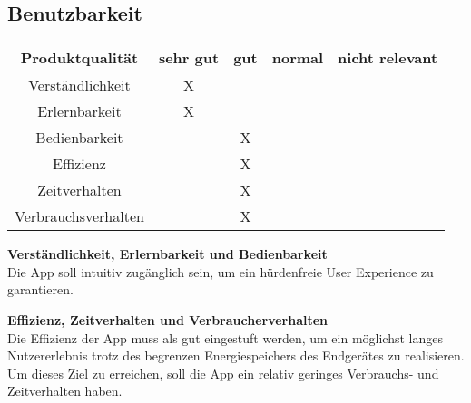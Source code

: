 \documentclass[parskip=full]{scrartcl}
\begin{document}
\subsection{Benutzbarkeit}
\begin{tabular}{| c | c | c | c | c |}
    \hline
    \textbf{Produktqualität} & \textbf{sehr gut} & \textbf{gut} & \textbf{normal} & \textbf{nicht relevant} \\ \hline
    Verständlichkeit         & X                 &              &                 &                         \\ \hline
    Erlernbarkeit            & X                 &              &                 &                         \\ \hline
    Bedienbarkeit            &                   & X            &                 &                         \\ \hline
    Effizienz                &                   & X            &                 &                         \\ \hline
    Zeitverhalten            &                   & X            &                 &                         \\ \hline
    Verbrauchsverhalten      &                   & X            &                 &                         \\ \hline
\end{tabular}

\textbf{Verständlichkeit, Erlernbarkeit und Bedienbarkeit}\\
Die App soll intuitiv zugänglich sein, um ein hürdenfreie User Experience zu garantieren.

\textbf{Effizienz, Zeitverhalten und Verbraucherverhalten}\\
Die Effizienz der App muss als gut eingestuft werden, um ein möglichst langes Nutzererlebnis trotz des begrenzen Energiespeichers des Endgerätes zu realisieren.
Um dieses Ziel zu erreichen, soll die App ein relativ geringes Verbrauchs- und Zeitverhalten haben.
\end{document}
